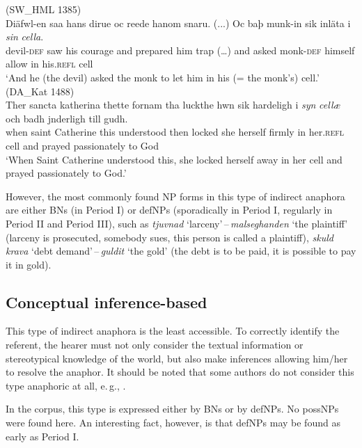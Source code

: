\documentclass[output=paper]{langsci/langscibook}
\begin{document}
\begin{exe}
\ex\label{6ex:31}
(SW\_HML 1385)\\
\gll Diäfwl-en saa hans dirue oc reede hanom snaru. (...) Oc baþ munk-in sik inläta i {\emph{sin}} {\emph{cella}}. \\
devil-{\textsc{def}} saw his courage and prepared him trap (…) and asked monk-{\textsc{def}} himself allow in his.{\textsc{refl}} cell \\
\glt `And he (the devil) asked the monk to let him in his (= the monk's) cell.'
\ex\label{6ex:32}
(DA\_Kat 1488)\\
\gll Ther sancta katherina thette fornam tha luckthe hwn sik hardeligh i {\emph{syn}} {\emph{cellæ}} och badh jnderligh till gudh. \\
when saint Catherine this understood then locked she herself firmly in her.{\textsc{refl}} cell and prayed passionately to God \\
\glt `When Saint Catherine understood this, she locked herself away in her cell and prayed passionately to God.'
\end{exe}

However, the most commonly found NP forms in this type of indirect anaphora are either BNs (in Period I) or defNPs (sporadically in Period I, regularly in Period II and Period III), such as {\emph{tjuvnad}} `larceny'\,--\,{\emph{malseghanden}} `the plaintiff' (larceny is prosecuted, somebody sues, this person is called a plaintiff), {\emph{skuld krava}} `debt demand'\,--\,{\emph{guldit}} `the gold' (the debt is to be paid, it is possible to pay it in gold).

\subsection{Conceptual inference-based}\label{6sec:44}

This type of indirect anaphora is the least accessible. To correctly identify the referent, the hearer must not only consider the textual information or stereotypical knowledge of the world, but also make inferences allowing him/her to resolve the anaphor. It should be noted that some authors do not consider this type anaphoric at all, e.\,g., \cite{irmer:11}. 

In the corpus, this type is expressed either by BNs or by defNPs. No possNPs were found here. An interesting fact, however, is that defNPs may be found as early as Period I. 
\end{document}
